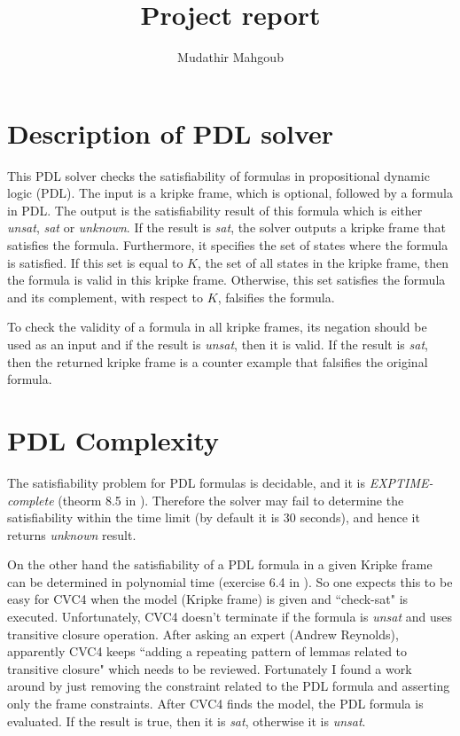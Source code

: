 \documentclass[12pt,a4paper]{article}
\author{Mudathir Mahgoub}
\title{Project report}
\begin{document}
\maketitle

\section{Description of PDL solver}
This PDL solver checks the satisfiability of formulas in propositional dynamic logic (PDL).
The input is a kripke frame, which is optional, followed by a formula in PDL. The output is the satisfiability result of this formula which is either \textit{unsat}, \textit{sat} or \textit{unknown}. If the result is \textit{sat}, the solver outputs a kripke frame that satisfies the formula. Furthermore, it specifies the set of states where the formula is satisfied. If this set is equal to $K$, the set of all states in the kripke frame, then the formula is valid in this kripke frame. Otherwise, this set satisfies the formula and its complement, with respect to $K$, falsifies the formula. 

To check the validity of a formula in all kripke frames, its negation should be used as an input and if the result is \textit{unsat}, then it is valid. If the result is \textit{sat}, then the returned kripke frame is a counter example that falsifies the original formula.

\section{PDL Complexity}

The satisfiability problem for PDL formulas is decidable, and it is \textit{EXPTIME-complete} (theorm 8.5 in \cite{dynamic}). Therefore the solver may fail to determine the satisfiability within the time limit (by default it is 30 seconds), and hence it returns \textit{unknown} result. 


On the other hand the satisfiability of a PDL formula in a given Kripke frame can be determined in polynomial time (exercise 6.4 in \cite{dynamic}). So one expects this to be easy for CVC4 when the model (Kripke frame) is given and ``check-sat" is executed. Unfortunately, CVC4 doesn't terminate if the formula is \textit{unsat} and uses transitive closure operation. After asking an expert (Andrew Reynolds), apparently CVC4 keeps  ``adding a repeating pattern of lemmas related to transitive closure" which needs to be reviewed. Fortunately I found a work around by just removing the constraint related to the PDL formula and asserting only the frame constraints. After CVC4 finds the model, the PDL formula is evaluated. If the result is true, then it is \textit{sat}, otherwise it is \textit{unsat}.
\end{document}

